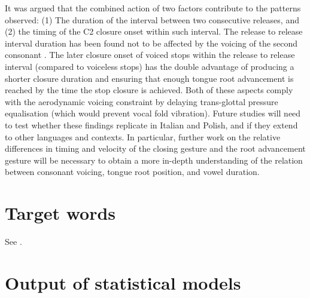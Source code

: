 \documentclass[
  12pt,
]{article}
\begin{document}
It was argued that the combined action of two factors contribute to the
patterns observed: (1) The duration of the interval between two
consecutive releases, and (2) the timing of the C2 closure onset within
such interval. The release to release interval duration has been found
not to be affected by the voicing of the second consonant
\citep{coretta2018j}. The later closure onset of voiced stops within the
release to release interval (compared to voiceless stops) has the double
advantage of producing a shorter closure duration and ensuring that
enough tongue root advancement is reached by the time the stop closure
is achieved. Both of these aspects comply with the aerodynamic voicing
constraint \citep{ohala2011} by delaying trans-glottal pressure
equalisation (which would prevent vocal fold vibration). Future studies
will need to test whether these findings replicate in Italian and
Polish, and if they extend to other languages and contexts. In
particular, further work on the relative differences in timing and
velocity of the closing gesture and the root advancement gesture will be
necessary to obtain a more in-depth understanding of the relation
between consonant voicing, tongue root position, and vowel duration.

\appendix

\hypertarget{target-words}{%
\section{Target words}\label{target-words}}

\label{a:targets}

See .


\hypertarget{output-of-statistical-models}{%
\section{Output of statistical
models}\label{output-of-statistical-models}}
\end{document}
